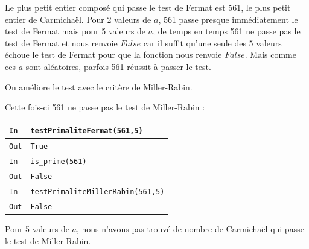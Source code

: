 \documentclass[titlepage]{article}
\begin{document}
    Le plus petit entier composé qui passe le test de Fermat est 561, le plus petit entier de Carmichaël.
    Pour 2 valeurs de $a$, 561 passe presque immédiatement le test de Fermat mais pour 5 valeurs de $a$, 
    de temps en temps 561 ne passe pas le test de Fermat et nous renvoie $False$ car il suffit qu'une seule
    des 5 valeurs échoue le test de Fermat pour que la fonction nous renvoie $False$. Mais comme ces $a$
    sont aléatoires, parfois 561 réussit à passer le test.\newline

    On améliore le test avec le critère de Miller-Rabin.

    

    Cette fois-ci 561 ne passe pas le test de Miller-Rabin : \bigbreak

    \begin{tabularx}{12cm}{|p{0.60cm}|X|}
        \hline
        \rowcolor{gray}
        \texttt{In}
        & 
        \texttt{testPrimaliteFermat(561,5)}
        \\
        \hline
        \texttt{Out}
        &
        \texttt{True}
        \\
        \hline
        \rowcolor{gray}
        \texttt{In}
        & 
        \texttt{is\_prime(561)}
        \\
        \hline
        \texttt{Out}
        &
        \texttt{False}
        \\
        \hline
        \rowcolor{gray}
        \texttt{In}
        & 
        \texttt{testPrimaliteMillerRabin(561,5)}
        \\
        \hline
        \texttt{Out}
        &
        \texttt{False}
        \\
        \hline
        
    \end{tabularx}
    \bigbreak

    Pour 5 valeurs de $a$, nous n'avons pas trouvé de nombre de Carmichaël qui passe le test de Miller-Rabin.
\end{document}
